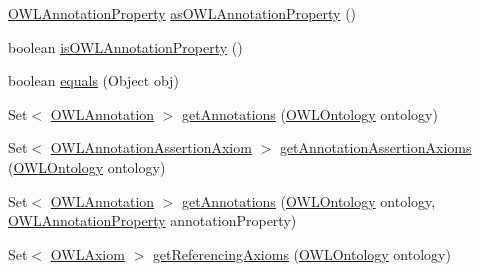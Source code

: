 \begin{DoxyCompactItemize}
\item 
\hyperlink{interfaceorg_1_1semanticweb_1_1owlapi_1_1model_1_1_o_w_l_annotation_property}{O\-W\-L\-Annotation\-Property} \hyperlink{classuk_1_1ac_1_1manchester_1_1cs_1_1owl_1_1owlapi_1_1_o_w_l_named_individual_impl_a825e82c48a59afa00619f28b566e19fe}{as\-O\-W\-L\-Annotation\-Property} ()
\item 
boolean \hyperlink{classuk_1_1ac_1_1manchester_1_1cs_1_1owl_1_1owlapi_1_1_o_w_l_named_individual_impl_a1f4f719ccfa15a294a02344046fb6a9b}{is\-O\-W\-L\-Annotation\-Property} ()
\item 
boolean \hyperlink{classuk_1_1ac_1_1manchester_1_1cs_1_1owl_1_1owlapi_1_1_o_w_l_named_individual_impl_a33ea87ebfd8ea74fe42ef36df59c4edd}{equals} (Object obj)
\item 
Set$<$ \hyperlink{interfaceorg_1_1semanticweb_1_1owlapi_1_1model_1_1_o_w_l_annotation}{O\-W\-L\-Annotation} $>$ \hyperlink{classuk_1_1ac_1_1manchester_1_1cs_1_1owl_1_1owlapi_1_1_o_w_l_named_individual_impl_a0578e78f674982c99f8ef6989ffa0f09}{get\-Annotations} (\hyperlink{interfaceorg_1_1semanticweb_1_1owlapi_1_1model_1_1_o_w_l_ontology}{O\-W\-L\-Ontology} ontology)
\item 
Set$<$ \hyperlink{interfaceorg_1_1semanticweb_1_1owlapi_1_1model_1_1_o_w_l_annotation_assertion_axiom}{O\-W\-L\-Annotation\-Assertion\-Axiom} $>$ \hyperlink{classuk_1_1ac_1_1manchester_1_1cs_1_1owl_1_1owlapi_1_1_o_w_l_named_individual_impl_accd402aaf3d73b53b83e039d70616e6d}{get\-Annotation\-Assertion\-Axioms} (\hyperlink{interfaceorg_1_1semanticweb_1_1owlapi_1_1model_1_1_o_w_l_ontology}{O\-W\-L\-Ontology} ontology)
\item 
Set$<$ \hyperlink{interfaceorg_1_1semanticweb_1_1owlapi_1_1model_1_1_o_w_l_annotation}{O\-W\-L\-Annotation} $>$ \hyperlink{classuk_1_1ac_1_1manchester_1_1cs_1_1owl_1_1owlapi_1_1_o_w_l_named_individual_impl_a6ddd9c95e00bc5fe2935c9b6c2d0e230}{get\-Annotations} (\hyperlink{interfaceorg_1_1semanticweb_1_1owlapi_1_1model_1_1_o_w_l_ontology}{O\-W\-L\-Ontology} ontology, \hyperlink{interfaceorg_1_1semanticweb_1_1owlapi_1_1model_1_1_o_w_l_annotation_property}{O\-W\-L\-Annotation\-Property} annotation\-Property)
\item 
Set$<$ \hyperlink{interfaceorg_1_1semanticweb_1_1owlapi_1_1model_1_1_o_w_l_axiom}{O\-W\-L\-Axiom} $>$ \hyperlink{classuk_1_1ac_1_1manchester_1_1cs_1_1owl_1_1owlapi_1_1_o_w_l_named_individual_impl_a51628684161e26603a7fdb662fd59461}{get\-Referencing\-Axioms} (\hyperlink{interfaceorg_1_1semanticweb_1_1owlapi_1_1model_1_1_o_w_l_ontology}{O\-W\-L\-Ontology} ontology)

\end{DoxyCompactItemize}
